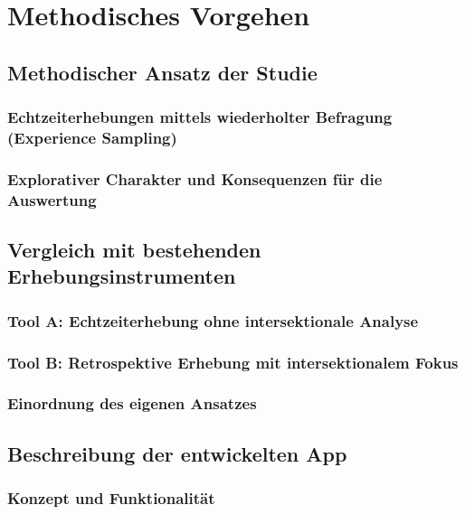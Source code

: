 
\section{Methodisches Vorgehen} \label{sec:methodik}

\subsection{Methodischer Ansatz der Studie}

\subsubsection{Echtzeiterhebungen mittels wiederholter Befragung (Experience Sampling)}

\subsubsection{Explorativer Charakter und Konsequenzen für die Auswertung}

\subsection{Vergleich mit bestehenden Erhebungsinstrumenten}

\subsubsection{Tool A: Echtzeiterhebung ohne intersektionale Analyse}

\subsubsection{Tool B: Retrospektive Erhebung mit intersektionalem Fokus}

\subsubsection{Einordnung des eigenen Ansatzes}

\subsection{Beschreibung der entwickelten App}

\subsubsection{Konzept und Funktionalität}

